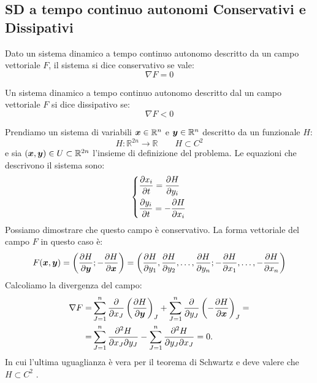 \subsection{SD a tempo continuo autonomi Conservativi e Dissipativi}%
\label{sub:SD a tempo continuo autonomi Conservativi e Dissipativi}
\begin{defn}
    Dato un sistema dinamico a tempo continuo autonomo descritto da un campo vettoriale $F$, il sistema si dice conservativo se vale:
    \[
        \nabla F = 0
    \] 
\end{defn}
\noindent
\begin{defn}
    Un sistema dinamico a tempo continuo autonomo descritto dal un campo vettoriale $F$ si dice dissipativo se:
    \[
        \nabla F < 0
    \] 
\end{defn}
\noindent
\begin{exmp}
    Prendiamo un sistema di variabili $\boldsymbol{x}  \in \mathbb{R}^n$ e $\boldsymbol{y}\in \mathbb{R}^n$ descritto da un funzionale $H$: 
    \[
        H: \mathbb{R}^{2n}\to \mathbb{R} \qquad H \subset C^2
    \] 
    e sia $(\boldsymbol{x}, \boldsymbol{y})\in U \subset \mathbb{R}^{2n}$ l'insieme di definizione del problema. Le equazioni che descrivono il sistema sono:
    \[\begin{dcases}
        \frac{\partial x_i}{\partial t} = \frac{\partial H}{\partial y_i} \\
	\frac{\partial y_i}{\partial t} = - \frac{\partial H}{\partial x_i} 
    \end{dcases}\] 
    Possiamo dimostrare che questo campo è conservativo. La forma vettoriale del campo $F$ in questo caso è:
    \[
	F(\boldsymbol{x},\boldsymbol{y}) = \left(\frac{\partial H}{\partial \boldsymbol{y}} ; - \frac{\partial H}{\partial \boldsymbol{x}} \right) = 
	\left(\frac{\partial H}{\partial y_1}, \frac{\partial H}{\partial y_2}, \ldots, \frac{\partial H}{\partial y_n}; - \frac{\partial H}{\partial x_1}, \ldots,- \frac{\partial H}{\partial x_n}  \right)
    \] 
    Calcoliamo la divergenza del campo:
    \[\begin{aligned}
	\nabla F =& \sum_{J=1}^{n} \frac{\partial }{\partial x_J} \left(\frac{\partial H}{\partial \boldsymbol{y}} \right)_J +
	\sum_{J=1}^{n} \frac{\partial }{\partial y_J} \left(-\frac{\partial H}{\partial \boldsymbol{x}} \right)_J = \\
	=& \sum_{J=1}^{n} \frac{\partial ^2H}{\partial x_J\partial y_J} -\sum_{J=1}^{n} \frac{\partial ^2H}{\partial y_J\partial x_J} = 0
    .\end{aligned}\]
    In cui l'ultima uguaglianza è vera per il teorema di Schwartz e deve valere che $H\subset C^2$ .
\end{exmp}
